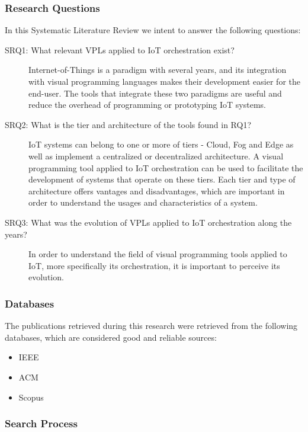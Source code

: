 \subsubsection{Research Questions}\label{sec:slr_research_questions}

In this Systematic Literature Review we intent to answer the following questions:

\begin{description}
    \item [SRQ1: What relevant VPLs applied to IoT orchestration exist?] Internet-of-Things is a paradigm with several years, and its integration with visual programming languages makes their development easier for the end-user. The tools that integrate these two paradigms are useful and reduce the overhead of programming or prototyping IoT systems.
    \item [SRQ2: What is the tier and architecture of the tools found in RQ1?] IoT systems can belong to one or more of tiers - Cloud, Fog and Edge as well as implement a centralized or decentralized architecture. A visual programming tool applied to IoT orchestration can be used to facilitate the development of systems that operate on these tiers. Each tier and type of architecture offers vantages and disadvantages, which are important in order to understand the usages and characteristics of a system.
    \item [SRQ3: What was the evolution of VPLs applied to IoT orchestration along the years?] In order to understand the field of visual programming tools applied to IoT, more specifically its orchestration, it is important to perceive its evolution.
\end{description}

\subsubsection{Databases}\label{sec:databases}

The publications retrieved during this research were retrieved from the following databases, which are considered good and reliable sources:

\begin{itemize}
    \item IEEE
    \item ACM
    \item Scopus
\end{itemize}{}

\subsubsection{Search Process}\label{sec:process}

